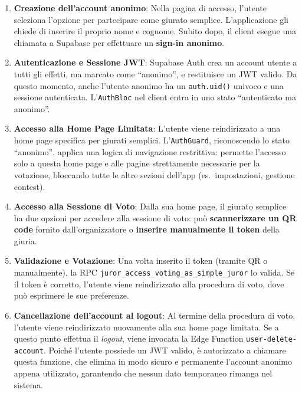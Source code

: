 \begin{enumerate}
    \item \textbf{Creazione dell'account anonimo}: Nella pagina di accesso, l'utente seleziona l'opzione per partecipare come giurato semplice.
    L'applicazione gli chiede di inserire il proprio nome e cognome.
    Subito dopo, il client esegue una chiamata a Supabase per effettuare un \textbf{sign-in anonimo}.

    \item \textbf{Autenticazione e Sessione JWT}: Supabase Auth crea un account utente a tutti gli effetti, ma marcato come ``anonimo'', e restituisce un JWT valido.
    Da questo momento, anche l'utente anonimo ha un \texttt{auth.uid()} univoco e una sessione autenticata.
    L'\texttt{AuthBloc} nel client entra in uno stato ``autenticato ma anonimo''.

    \item \textbf{Accesso alla Home Page Limitata}: L'utente viene reindirizzato a una home page specifica per giurati semplici.
    L'\texttt{AuthGuard}, riconoscendo lo stato ``anonimo'', applica una logica di navigazione restrittiva: permette l'accesso solo a questa home page e alle pagine strettamente necessarie per la votazione, bloccando tutte le altre sezioni dell'app (es.\ impostazioni, gestione contest).

    \item \textbf{Accesso alla Sessione di Voto}: Dalla sua home page, il giurato semplice ha due opzioni per accedere alla sessione di voto: può \textbf{scannerizzare un QR code} fornito dall'organizzatore o \textbf{inserire manualmente il token} della giuria.

    \item \textbf{Validazione e Votazione}: Una volta inserito il token (tramite QR o manualmente), la RPC \texttt{juror\_access\_voting\_as\_simple\_juror} lo valida.
    Se il token è corretto, l'utente viene reindirizzato alla procedura di voto, dove può esprimere le sue preferenze.

    \item \textbf{Cancellazione dell'account al logout}: Al termine della procedura di voto, l'utente viene reindirizzato nuovamente alla sua home page limitata.
    Se a questo punto effettua il \emph{logout}, viene invocata la Edge Function \texttt{user-delete-account}.
    Poiché l'utente possiede un JWT valido, è autorizzato a chiamare questa funzione, che elimina in modo sicuro e permanente l'account anonimo appena utilizzato, garantendo che nessun dato temporaneo rimanga nel sistema.
\end{enumerate}

